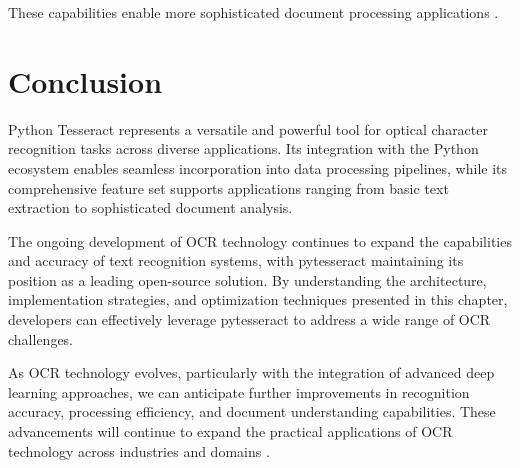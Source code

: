These capabilities enable more sophisticated document processing applications \cite{Anitha:2024}.

\section{Conclusion}
\label{sec:conclusion}

Python Tesseract represents a versatile and powerful tool for optical character recognition tasks across diverse applications. Its integration with the Python ecosystem enables seamless incorporation into data processing pipelines, while its comprehensive feature set supports applications ranging from basic text extraction to sophisticated document analysis.

The ongoing development of OCR technology continues to expand the capabilities and accuracy of text recognition systems, with pytesseract maintaining its position as a leading open-source solution. By understanding the architecture, implementation strategies, and optimization techniques presented in this chapter, developers can effectively leverage pytesseract to address a wide range of OCR challenges.

As OCR technology evolves, particularly with the integration of advanced deep learning approaches, we can anticipate further improvements in recognition accuracy, processing efficiency, and document understanding capabilities. These advancements will continue to expand the practical applications of OCR technology across industries and domains \cite{Restack:2025}.


